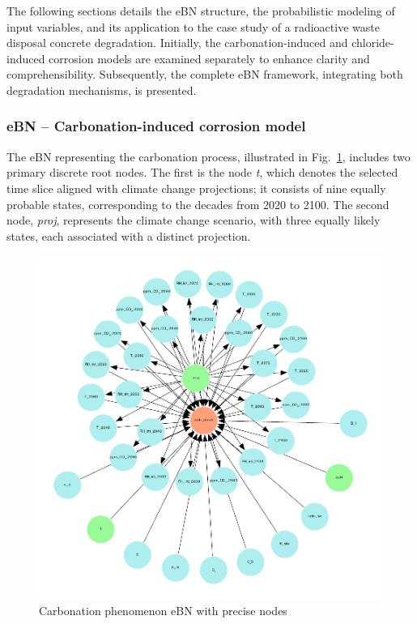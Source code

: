 The following sections details the eBN structure, the probabilistic modeling of input variables, and its application to the case study of a radioactive waste disposal concrete degradation. Initially, the carbonation-induced and chloride-induced corrosion models are examined separately to enhance clarity and comprehensibility. Subsequently, the complete eBN framework, integrating both degradation mechanisms, is presented.

\subsubsection{eBN -- Carbonation-induced corrosion model}\label{ebn_carbonation_section}
The eBN representing the carbonation process, illustrated in Fig.~\ref{carbonation_ebn}, includes two primary discrete root nodes. The first is the node \textit{t}, which denotes the selected time slice aligned with climate change projections; it consists of nine equally probable states, corresponding to the decades from 2020 to 2100. The second node, \textit{proj}, represents the climate change scenario, with three equally likely states, each associated with a distinct projection.
\begin{figure}[H]
    \centering
    \includegraphics[width=\linewidth]{imgs/pdfs/8_carb_ebn.pdf}
    \caption{Carbonation phenomenon eBN with precise nodes}\label{carbonation_ebn}
\end{figure}
